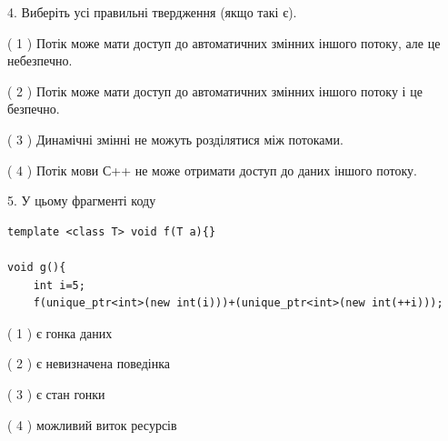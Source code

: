 \documentclass[12pt, ukrainian]{article}
\begin{document}
\begin {large}
{%
4. Виберіть усі правильні твердження (якщо такі є).\par
\vspace{2mm}

( 1 ) Потік може мати доступ до автоматичних змінних іншого потоку, але це небезпечно.%

( 2 ) Потік може мати доступ до автоматичних змінних іншого потоку і це безпечно.%

( 3 ) Динамічні змінні не можуть розділятися між потоками.%

( 4 ) Потік мови С++ не може отримати доступ до даних іншого потоку.%


5. У цьому фрагменті коду
\begin{verbatim}
template <class T> void f(T a){}

void g(){
    int i=5;
    f(unique_ptr<int>(new int(i)))+(unique_ptr<int>(new int(++i)));
\end{verbatim}
( 1 ) є гонка даних%

( 2 ) є невизначена поведінка%

( 3 ) є стан гонки%

( 4 ) можливий виток ресурсів%
}
\end {large}
\end{document}
